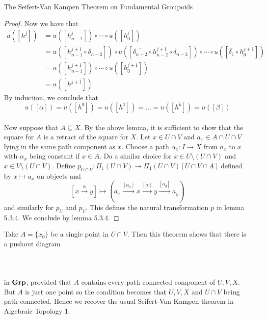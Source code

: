 \documentclass[a4paper]{article}
\begin{document}
\begin{thm}{The Seifert-Van Kampen Theorem on Fundamental Groupoids}{}
\begin{proof}
Now we have that 
\begin{align*}
u([h^j])&=u([h_{n-1}^j])\circ\cdots\circ u([h_0^j])\\
&=u([h_{n-1}^{j+1}\circ\delta_{n-2}])\circ u([\overline{\delta_{n-2}}\circ h_{n-2}^{j+1}\circ\delta_{n-3}])\circ\cdots\circ u([\overline{\delta_1}\circ h_0^{j+1}])\\
&=u([h_{n-1}^{j+1}])\circ\cdots\circ u([h_0^{j+1}])\\
&=u([h^{j+1}])
\end{align*}
By induction, we conclude that $$u([\alpha])=u([h^0])=u([h^1])=\dots=u([h^k])=u([\beta])$$~\\

Now suppose that $A\subseteq X$. By the above lemma, it is sufficient to show that the square for $A$ is a retract of the square for $X$. Let $x\in U\cap V$ and $a_x\in A\cap U\cap V$ lying in the same path component as $x$. Choose a path $\alpha_x:I\to X$ from $a_x$ to $x$ with $\alpha_x$ being constant if $x\in A$. Do a similar choice for $x\in U\setminus(U\cap V)$ and $x\in V\setminus(U\cap V)$. Define $p_{U\cap V}:\Pi_1(U\cap V)\to\Pi_1(U\cap V)[U\cap V\cap A]$ defined by $x\mapsto a_x$ on objects and $$[x\overset{\alpha}{\to} y]\mapsto\left(a_x\overset{[\alpha_x]}{\to}x\overset{[\alpha]}{\to}y\overset{[\alpha_y]}{\to}a_y\right)$$ and similarly for $p_U$ and $p_V$. This defines the natural transformation $p$ in lemma 5.3.4. We conclude by lemma 5.3.4. 
\end{proof}
\end{thm}

Take $A=\{x_0\}$ be a single point in $U\cap V$. Then this theorem shows that there is a pushout diagram \\~\\
\\~\\
in $\bold{Grp}$, provided that $A$ contains every path connected component of $U,V,X$. But $A$ is just one point so the condition becomes that $U,V,X$ and $U\cap V$ being path connected. Hence we recover the usual Seifert-Van Kampen theorem in Algebraic Topology 1. 
\end{document}
